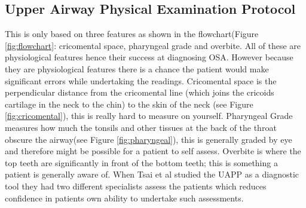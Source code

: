\subsection{Upper Airway Physical Examination Protocol}
This is only based on three features as shown in the flowchart(Figure \ref{fig:flowchart}: cricomental space, pharyngeal grade and overbite. All of these are physiological features hence their success at diagnosing OSA. However because they are physiological features there is a chance the patient would make significant errors while undertaking the readings. Cricomental space is the perpendicular distance from the cricomental line (which joins the cricoids cartilage in the neck to the chin) to the skin of the neck (see Figure \ref{fig:cricomental}), this is really hard to measure on yourself. Pharyngeal Grade measures how much the tonsils and other tissues at the back of the throat obscure the airway(see Figure \ref{fig:pharyngeal}), this is generally graded by eye and therefore might be possible for a patient to self assess. Overbite is where the top teeth are significantly in front of the bottom teeth; this is something a patient is generally aware of. When Tsai et al studied the UAPP as a diagnostic tool they had two different specialists assess the patients which reduces confidence in patients own ability to undertake such assessments. 

